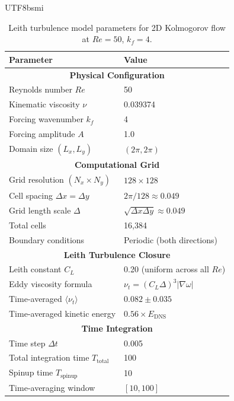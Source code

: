 \documentclass[master]{NTHUthesis}
\begin{document}
\begin{CJK*}{UTF8}{bsmi}
\begin{table}[htbp]
    \centering
    \caption{Leith turbulence model parameters for 2D Kolmogorov flow at $Re=50$, $k_f=4$.}
    \label{tab:kolmogorov_rans_params}
    \begin{tabular}{ll}
    \toprule
    \textbf{Parameter} & \textbf{Value} \\
    \midrule
    \multicolumn{2}{c}{\textbf{Physical Configuration}} \\
    Reynolds number $Re$ & 50 \\
    Kinematic viscosity $\nu$ & 0.039374 \\
    Forcing wavenumber $k_f$ & 4 \\
    Forcing amplitude $A$ & 1.0 \\
    Domain size $(L_x, L_y)$ & $(2\pi, 2\pi)$ \\
    \midrule
    \multicolumn{2}{c}{\textbf{Computational Grid}} \\
    Grid resolution $(N_x \times N_y)$ & $128 \times 128$ \\
    Cell spacing $\Delta x = \Delta y$ & $2\pi/128 \approx 0.049$ \\
    Grid length scale $\Delta$ & $\sqrt{\Delta x \Delta y} \approx 0.049$ \\
    Total cells & 16,384 \\
    Boundary conditions & Periodic (both directions) \\
    \midrule
    \multicolumn{2}{c}{\textbf{Leith Turbulence Closure}} \\
    Leith constant $C_L$ & 0.20 (uniform across all $Re$) \\
    Eddy viscosity formula & $\nu_t = (C_L \Delta)^3 |\nabla \omega|$ \\
    Time-averaged $\langle \nu_t \rangle$ & $0.082 \pm 0.035$ \\
    Time-averaged kinetic energy & $0.56 \times E_{\text{DNS}}$ \\
    \midrule
    \multicolumn{2}{c}{\textbf{Time Integration}} \\
    Time step $\Delta t$ & 0.005 \\
    Total integration time $T_{\text{total}}$ & 100 \\
    Spinup time $T_{\text{spinup}}$ & 10 \\
    Time-averaging window & $[10, 100]$ \\
    \bottomrule
    \end{tabular}
\end{table}


\end{CJK*}
\end{document}
